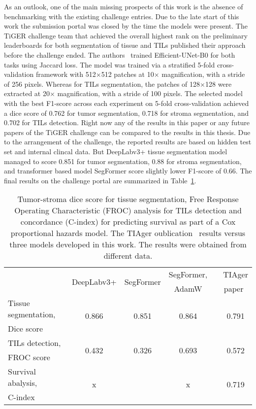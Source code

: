 As an outlook, one of the main missing prospects of this work is the absence of
benchmarking with the existing challenge entries. Due to the late start of this
work the submission portal was closed by the time the models were present. 
The TiGER challenge team that achieved the overall highest rank on the preliminary leaderboards
for both segmentation of tissue and TILs published their approach before the challenge ended.
The authors~\cite{shephard2022tiager} trained Efficient-UNet-B0 for both tasks using Jaccard loss.
The model was trained via a stratified 5-fold
cross-validation framework with 512$\times$512 patches at 10$\times$ magnification,
with a stride of 256 pixels. Whereas for TILs segmentation,
the patches of 128$\times$128 were extracted at 20$\times$ magnification, with a stride of 100 pixels.
The selected model with the best F1-score across each experiment on 5-fold cross-validation achieved
a dice score of 0.762 for tumor segmentation, 0.718 for stroma segmentation, and 0.702 for TILs
detection. Right now any of the results in this paper or any future papers
of the TiGER challenge can be compared to the results in this thesis. Due to the arrangement of the
challenge, the reported results are based on hidden test set and internal clincal data.
But DeepLabv3+ tissue segmentation model managed to score
0.851 for tumor segmentation, 0.88 for stroma segmentation, and transformer based model SegFormer
score slightly lower F1-score of 0.66. The final results on the challenge portal are summarized in
Table~\ref{tab:compare_paper}.
\begin{table}[H]
    \centering
    \begin{tabular}{ l c c c c c }
        \hline
         & \multirow{2}{*}{DeepLabv3+} & \multirow{2}{*}{SegFormer} & SegFormer, & & TIAger\\
         &  &  & AdamW & & paper~\cite{shephard2022tiager}\\
        \hline
        Tissue segmentation, & \multirow{2}{*}{0.866} & \multirow{2}{*}{0.851} & \multirow{2}{*}{0.864} & & \multirow{2}{*}{0.791} \\
        Dice score &  &  &  & &  \\
        TILs detection, & \multirow{2}{*}{0.432} & \multirow{2}{*}{0.326} & \multirow{2}{*}{0.693} & & \multirow{2}{*}{0.572}\\
        FROC score &  &  &  & &  \\
        Survival abalysis, & \multirow{2}{*}{x} &  & \multirow{2}{*}{x} & & \multirow{2}{*}{0.719}\\
        C-index &  &  &  & &  \\
        \hline
    \end{tabular}
\caption{\label{tab:compare_paper} Tumor-stroma dice score for tissue segmentation,
Free Response Operating Characteristic (FROC)
analysis for TILs detection and concordance (C-index) for predicting survival as part
of a Cox proportional hazards model. The TIAger oublication~\cite{shephard2022tiager} results versus three
models developed in this work. The results were obtained from different data.}
\end{table}
